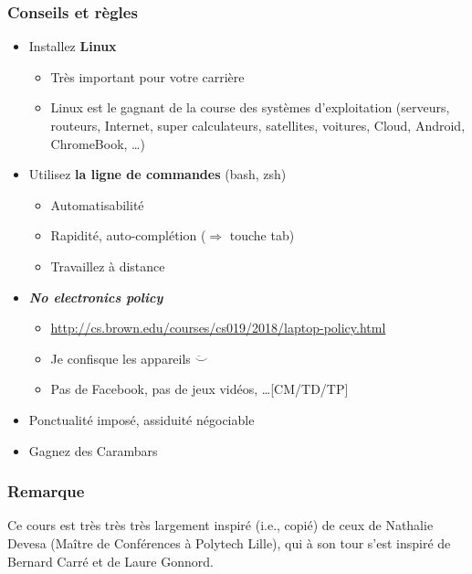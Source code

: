 \documentclass[12pt,svgnames]{beamer}
\begin{document}
\begin{frame}
	\frametitle{Conseils et règles}
	\begin{itemize}
		\item Installez \textbf{Linux}
		\begin{itemize}
			\item Très important pour votre carrière
			\item Linux est le gagnant de la course des systèmes d'exploitation (serveurs, routeurs, Internet, super calculateurs, satellites, voitures, Cloud, Android, ChromeBook, \ldots)
		\end{itemize}
		\item Utilisez \textbf{la ligne de commandes} (bash, zsh)
		\begin{itemize}
			\item Automatisabilité
			\item Rapidité, auto-complétion ($\Rightarrow$ touche tab)
			\item Travaillez à distance
		\end{itemize}
		\item \textbf{\textit{No electronics policy}}
		\begin{itemize}
		\item \url{http://cs.brown.edu/courses/cs019/2018/laptop-policy.html}
		\item Je confisque les appareils $\ddot\smile$
		\item Pas de Facebook, pas de jeux vidéos, \ldots [CM/TD/TP]
		\end{itemize}		
		\item Ponctualité imposé, assiduité négociable
		\item Gagnez des Carambars
	\end{itemize}
\end{frame}



\begin{frame}
	\frametitle{Remarque}
	\Large Ce cours est très très très largement inspiré (i.e., copié) de ceux de Nathalie Devesa (Maître de Conférences à Polytech Lille), qui à son tour s'est inspiré de Bernard Carré et de Laure Gonnord.
\end{frame}
\end{document}
